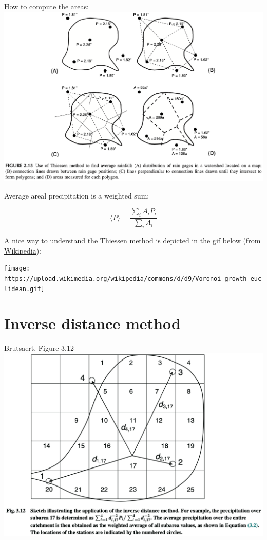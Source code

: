 \documentclass[
  letterpaper,
  DIV=11,
  numbers=noendperiod]{scrreprt}
\begin{document}
How to compute the areas:
\includegraphics{archive/figures/ward-figure2.15.png}

Average areal precipitation is a weighted sum:

\[
\langle P \rangle = \frac{\sum_i A_i P_i}{\sum_i A_i}
\]

A nice way to understand the Thiessen method is depicted in the gif
below (from
\href{https://commons.wikimedia.org/wiki/File:Voronoi_growth_euclidean.gif}{Wikipedia}):

\texttt{[image: https://upload.wikimedia.org/wikipedia/commons/d/d9/Voronoi\_growth\_euclidean.gif]}

\hypertarget{inverse-distance-method}{%
\section{Inverse distance method}\label{inverse-distance-method}}

Brutsaert, Figure 3.12
\includegraphics{archive/figures/brutsaert-figure3.12.png}
\end{document}

